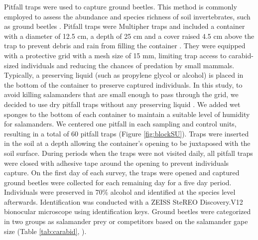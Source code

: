 Pitfall traps were used to capture ground beetles.
This method is commonly employed to assess the abundance and species richness of soil invertebrates, such as ground beetles \citep{baarsCatchesPitfallTraps1979,knappEffectPitfallTrap2012,kotzeFortyYearsCarabid2011a,loveiEcologyBehaviorGround1996,spenceSamplingCarabidAssemblages1994a}. 
Pitfall traps were Multipher\up{\textregistered{}} traps and included a container with a diameter of 12.5 cm, a depth of 25 cm and a cover raised 4.5 cm above the trap 
to prevent debris and rain from filling the container \citep{bouchardBeetleCommunityResponse2016b,Jobin1988MultiPherinsect,mooreEffectsTwoSilvicultural2004}.
They were equipped with a protective grid with a mesh size of 15 mm, limiting trap access to carabid-sized individuals and reducing the chances of predation by small mammals. 
Typically, a preserving liquid (such as propylene glycol or alcohol) is placed in the bottom of the container to preserve captured individuals. 
In this study, to avoid killing salamanders that are small enough to pass through the grid, we decided to use dry pitfall traps without any preserving liquid \citep{luffFeaturesInfluencingEfficiency1975}. 
We added wet sponges to the bottom of each container to maintain a suitable level of humidity for salamanders.
We centered one pitfall in each sampling and control units, resulting in a total of 60 pitfall traps (Figure \ref{fig:blockSU}). 
Traps were inserted in the soil at a depth allowing the container's opening to be juxtaposed with the soil surface. 
During periods when the traps were not visited daily, all pitfall traps were closed with adhesive tape around the opening to prevent individuals capture. 
On the first day of each survey, the traps were opened and captured ground beetles were collected for each remaining day for a five day period. 
Individuals were preserved in 70\% alcohol and identified at the species level afterwards.
Identification was conducted with a ZEISS SteREO Discovery.V12 bionocular microscope using \cite{larochelleManuelIdentificationCarabidae1976} identification keys.
Ground beetles were categorized in two groups as salamander prey or competitors based on the salamander gape size (Table \ref{tab:carabid}, \citealp{jaegerFoodLimitedResource1972,magliaModulationPreycaptureBehavior1995,magliaOntogenyFeedingEcology1996}).

